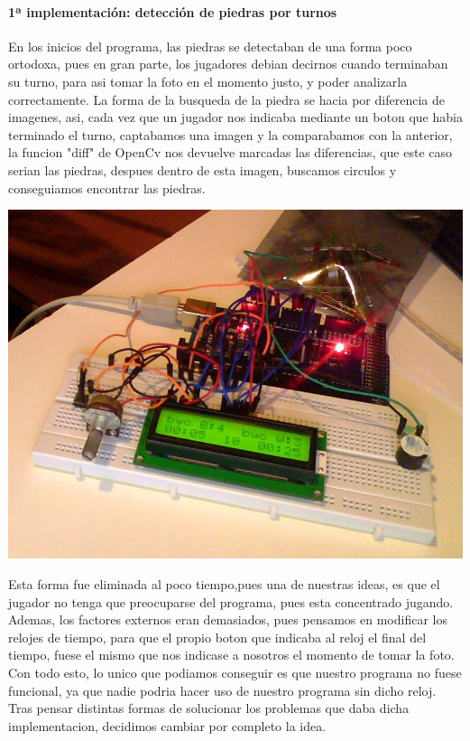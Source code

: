 \documentclass[12pt,a4paper]{report}
\begin{document}
\paragraph{1ª implementación: detección de piedras por turnos}
En los inicios del programa, las piedras se detectaban de una forma poco
ortodoxa, pues en gran parte, los jugadores debian decirnos cuando terminaban su
turno, para asi tomar la foto en el momento justo, y poder analizarla
correctamente.  La forma de la busqueda de la piedra se hacia por diferencia de
imagenes, asi, cada vez que un jugador nos indicaba mediante un boton que habia
terminado el turno, captabamos una imagen y la comparabamos con la anterior, la
funcion "diff" de OpenCv nos devuelve marcadas las diferencias, que este caso
serian las piedras, despues dentro de esta imagen, buscamos circulos y
conseguiamos encontrar las piedras.  

\includegraphics[scale=0.4]{reloj.jpg}

Esta forma fue eliminada al poco tiempo,pues una de nuestras ideas, es que el
jugador no tenga que preocuparse del programa, pues esta concentrado jugando.
Ademas, los factores externos eran demasiados, pues pensamos en modificar los
relojes de tiempo, para que el propio
boton que indicaba al reloj el final del tiempo, fuese el mismo que nos indicase
a nosotros el momento de tomar la foto. Con todo esto, lo unico que podiamos
conseguir es que nuestro programa no fuese funcional, ya que nadie podria hacer
uso de nuestro programa sin dicho reloj. Tras pensar distintas formas de
solucionar los problemas que daba dicha implementacion, decidimos cambiar por
completo la idea.  %
\end{document}
